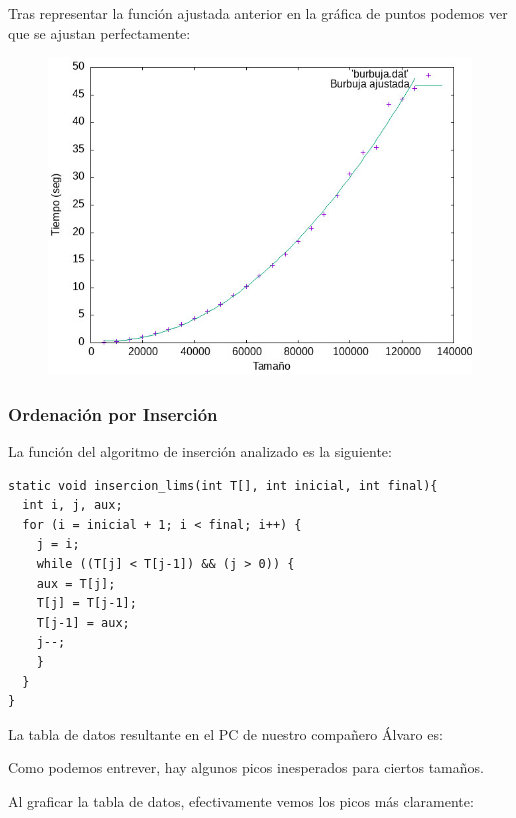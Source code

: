 \documentclass[12pt, spanish]{article}
\begin{document}
Tras representar la función ajustada anterior en la gráfica de puntos podemos ver que se ajustan perfectamente:
\begin{figure}[H]
  \centering
  \includegraphics[scale = 0.8]{burbujaAjustada.png}
\end{figure}

\subsubsection{Ordenación por Inserción}
La función del algoritmo de inserción analizado es la siguiente:

\begin{verbatim}
static void insercion_lims(int T[], int inicial, int final){
  int i, j, aux;
  for (i = inicial + 1; i < final; i++) {
	j = i;
	while ((T[j] < T[j-1]) && (j > 0)) {
  	aux = T[j];
  	T[j] = T[j-1];
  	T[j-1] = aux;
  	j--;
	}
  }
}
\end{verbatim}

\newpage

La tabla de datos resultante en el PC de nuestro compañero Álvaro es:

\begin{center}
Como podemos entrever, hay algunos picos inesperados para ciertos tamaños.

\newpage

Al graficar la tabla de datos, efectivamente vemos los picos más claramente:
\end{center}
\end{document}
